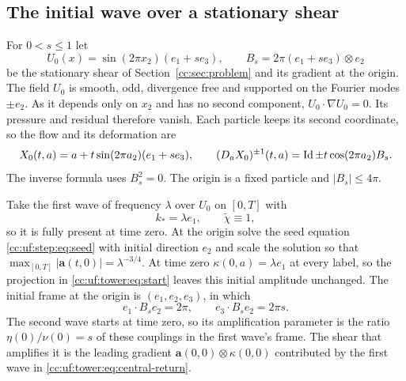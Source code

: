 \subsection{The initial wave over a stationary shear}\label{cc:uf:sec:first-wave}
For $0<s\le1$ let
\begin{equation}\label{cc:uf:base:eq:stationary}
 U_0(x)=\sin(2\pi x_2)(e_1+se_3),\qquad B_s=2\pi(e_1+se_3)\otimes e_2
\end{equation}
be the stationary shear of Section~\ref{cc:sec:problem} and its gradient
at the origin. The field $U_0$ is smooth, odd, divergence free and
supported on the Fourier modes $\pm e_2$. As it depends only on $x_2$
and has no second component, $U_0\cdot\nabla U_0=0$. Its pressure and
residual therefore vanish. Each particle keeps its second coordinate,
so the flow and its deformation are
\begin{equation}\label{cc:uf:base:eq:deformation}
 X_0(t,a)=a+t\sin(2\pi a_2)(e_1+se_3),\qquad
 (D_aX_0)^{\pm1}(t,a)=\operatorname{Id}\pm t\cos(2\pi a_2) B_s.
\end{equation}
The inverse formula uses $B_s^2=0$. The origin is a fixed particle and
$|B_s|\le4\pi$.

Take the first wave of frequency $\lambda$ over $U_0$ on $[0,T]$ with
\begin{equation}\label{cc:uf:base:eq:first-wave}
 k_*=\lambda e_1,\qquad \widetilde\chi\equiv1,
\end{equation}
so it is fully present at time zero. At the origin solve the seed
equation \eqref{cc:uf:step:eq:seed} with initial direction $e_2$ and
scale the solution so that $\max_{[0,T]}|\mathbf a(t,0)|=\lambda^{-3/4}$.
At time zero $\kappa(0,a)=\lambda e_1$ at every label, so the projection
in \eqref{cc:uf:tower:eq:start} leaves this initial amplitude unchanged.
The initial frame at the origin is $(e_1,e_2,e_3)$, in which
\begin{equation}\label{cc:uf:base:eq:shear-couplings}
 e_1\cdot B_se_2=2\pi,\qquad e_3\cdot B_se_2=2\pi s .
\end{equation}
The second wave starts at time zero, so its amplification parameter is
the ratio $\eta(0)/\nu(0)=s$ of these couplings in the first wave's
frame. The shear that amplifies it is the leading
gradient $\mathbf a(0,0)\otimes\kappa(0,0)$ contributed by the first
wave in \eqref{cc:uf:tower:eq:central-return}.

